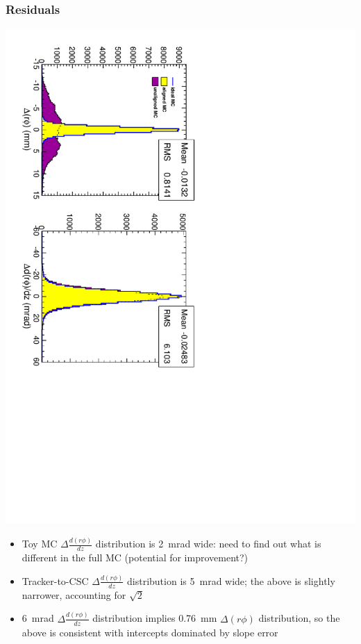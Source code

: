 \documentclass[compress]{beamer}
\begin{document}
\begin{frame}
\frametitle{Residuals}
\begin{center}
\includegraphics[height=0.8\linewidth, angle=90]{residuals.pdf}
\end{center}

\vfill
\begin{itemize}
\item Toy MC $\Delta \frac{d(r\phi)}{dz}$ distribution is 2~mrad wide: need to find out what is different in the full MC (potential for improvement?)
\item Tracker-to-CSC $\Delta \frac{d(r\phi)}{dz}$ distribution is 5~mrad wide; the above is slightly narrower, accounting for $\sqrt{2}$
\item 6~mrad $\Delta \frac{d(r\phi)}{dz}$ distribution implies 0.76~mm $\Delta (r\phi)$ distribution, so the above is consistent with intercepts dominated by slope error
\end{itemize}
\end{frame}
\end{document}
